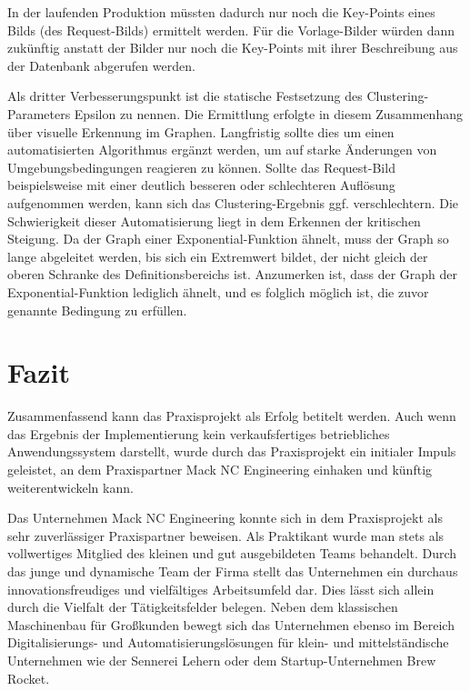 \documentclass[
    type=Projektarbeit,
    status=draft, %
    language=german, %
    bibengine=bibtex,
]{unibwm-inf-thesis}
\begin{document}
    In der laufenden Produktion müssten dadurch nur noch die Key-Points eines Bilds (des Request-Bilds) ermittelt werden.
    Für die Vorlage-Bilder würden dann zukünftig anstatt der Bilder nur noch die Key-Points mit ihrer Beschreibung aus der Datenbank abgerufen werden.

    Als dritter Verbesserungspunkt ist die statische Festsetzung des Clustering-Parameters Epsilon zu nennen.
    Die Ermittlung erfolgte in diesem Zusammenhang über visuelle Erkennung im Graphen.
    Langfristig sollte dies um einen automatisierten Algorithmus ergänzt werden, um auf starke Änderungen von Umgebungsbedingungen reagieren zu können.
    Sollte das Request-Bild beispielsweise mit einer deutlich besseren oder schlechteren Auflösung aufgenommen werden, kann sich das Clustering-Ergebnis ggf. verschlechtern.
    Die Schwierigkeit dieser Automatisierung liegt in dem Erkennen der kritischen Steigung.
    Da der Graph einer Exponential-Funktion ähnelt, muss der Graph so lange abgeleitet werden, bis sich ein Extremwert bildet, der nicht gleich der oberen Schranke des Definitionsbereichs ist.
    Anzumerken ist, dass der Graph der Exponential-Funktion lediglich ähnelt, und es folglich möglich ist, die zuvor genannte Bedingung zu erfüllen.

   \chapter{Fazit}
    Zusammenfassend kann das Praxisprojekt als Erfolg betitelt werden.
    Auch wenn das Ergebnis der Implementierung kein verkaufsfertiges betriebliches Anwendungssystem darstellt, wurde durch das Praxisprojekt ein
    initialer Impuls geleistet, an dem Praxispartner Mack NC Engineering einhaken und künftig weiterentwickeln kann.

    Das Unternehmen Mack NC Engineering konnte sich in dem Praxisprojekt als sehr zuverlässiger Praxispartner beweisen.
    Als Praktikant wurde man stets als vollwertiges Mitglied des kleinen und gut ausgebildeten Teams behandelt.
    Durch das junge und dynamische Team der Firma stellt das Unternehmen ein durchaus innovationsfreudiges und vielfältiges Arbeitsumfeld dar.
    Dies lässt sich allein durch die Vielfalt der Tätigkeitsfelder belegen.
    Neben dem klassischen Maschinenbau für Großkunden bewegt sich das Unternehmen ebenso im Bereich Digitalisierungs- und Automatisierungslösungen für klein- und mittelständische
    Unternehmen wie der Sennerei Lehern oder dem Startup-Unternehmen Brew Rocket.
\end{document}

